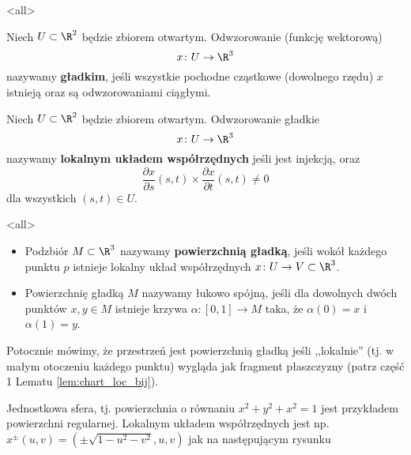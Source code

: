 \mode*
\mode<all>{}

\begin{frame}[<+->]
\begin{definicja}
Niech $U\subset\R^2$ będzie zbiorem otwartym. Odwzorowanie (funkcję wektorową) \[x\colon U\to \R^3\] nazywamy \textbf{gładkim}, jeśli wszystkie pochodne cząstkowe (dowolnego rzędu) $x$ istnieją oraz są odwzorowaniami ciągłymi.
\end{definicja}

\begin{definicja}
Niech $U\subset \R^2$ będzie zbiorem otwartym. Odwzorowanie gładkie
\[x\colon U\to \R^3\]
nazywamy \textbf{lokalnym układem współrzędnych} jeśli jest injekcją, oraz \[\frac{\partial x}{\partial s}(s,t)\times \frac{\partial x}{\partial t}(s,t)\neq 0\] dla wszystkich $(s,t)\in U$.
\end{definicja}

\end{frame}
\mode<all>{}
\begin{frame}[<+->]

\begin{definicja}\label{def:surface}
\begin{itemize}
\item 
Podzbiór $M\subset \R^3$ nazywamy \textbf{powierzchnią gładką}, jeśli wokół każdego punktu $p$ istnieje lokalny układ współrzędnych $x\colon U\to V\subset \R^3$. 

% 
\item Powierzchnię gładką $M$ nazywamy łukowo spójną, jeśli dla dowolnych dwóch punktów $x,y\in M$ istnieje krzywa $\alpha\colon [0,1]\to M$ taka, że $\alpha(0)=x$ i $\alpha(1)=y$.
\end{itemize}
\end{definicja}

\pause Potocznie mówimy, że przestrzeń jest powierzchnią gładką jeśli ,,lokalnie'' (tj. w małym otoczeniu każdego punktu) wygląda jak fragment płaszczyzny (patrz część 1 Lematu \ref{lem:chart_loc_bij}).


\end{frame}
\begin{frame}[<+->]

\begin{przyklad}
Jednostkowa sfera, tj. powierzchnia o równaniu $x^2+y^2+x^2=1$ jest przykładem powierzchni regularnej. Lokalnym układem współrzędnych jest np. $x^\pm(u,v)=(\pm\sqrt{1-u^2-v^2},u,v)$ jak na następującym rysunku

\begin{center}

\end{center}
\end{przyklad}

\end{frame}
